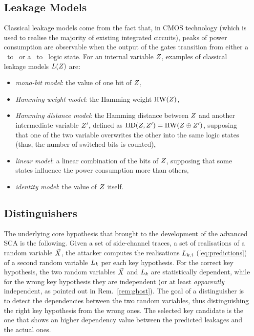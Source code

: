 \subsection{Leakage Models}\label{sec:leakage_models}
Classical leakage models come from the fact that, in CMOS technology (which is used to realise the majority of existing integrated circuits), peaks of power consumption are observable when the output of the gates transition from either a \textquotedbl \  to \textquotedbl \ or a \textquotedbl \ to \textquotedbl \ logic state.  For an internal variable $Z$, examples of classical leakage models $L(Z)$ are:
\begin{itemize}
\item \emph{mono-bit model}: the value of one bit of $Z$,
\item\emph{Hamming weight model}: the Hamming weight $\mathrm{HW}(Z)$,
\item \emph{Hamming distance model}: the Hamming distance between $Z$ and another intermediate variable $Z^\prime$, defined as $\mathrm{HD}(Z,Z^\prime) = \mathrm{HW}(Z\oplus Z^\prime)$, supposing \eg that one of the two variable overwrites the other into the same logic states (thus, the number of switched bits is counted),
\item \emph{linear model}: a linear combination of the bits of $Z$, supposing that some states influence the power consumption more than others, 
\item \emph{identity model}: the value of $Z$ itself.
\end{itemize} 

\subsection{Distinguishers}\label{sec:distinguishers}
The underlying core hypothesis that brought to the development of the advanced SCA is the following. Given a set of side-channel traces, \ie a set of realisations of a random variable $\vec{X}$, the attacker computes the realisations $L_{k,i}$ (\via \eqref{eq:predictions}) of a second random variable $L_k$ per each key hypothesis. For the correct key hypothesis, the two random variables $\vec{X}$ and $L_k$ are statistically dependent, while for the wrong key hypothesis they are independent (or at least \emph{apparently} independent, as pointed out in Rem.~\ref{rem:ghost}). The goal of a distinguisher is to detect the dependencies between the two random variables, thus distinguishing the right key hypothesis from the wrong ones. The selected key candidate is the one that shows an higher dependency value between the  predicted leakages and the actual ones. 

